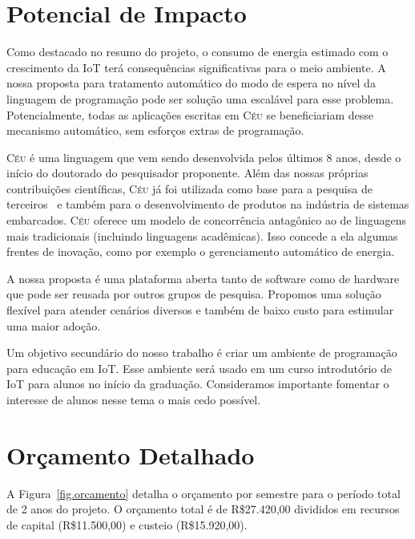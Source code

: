 \documentclass[titlepage,12pt]{article}
\newcommand{\CEU}{\textsc{C\'{e}u}\xspace}
\begin{document}
\section{ Potencial de Impacto }

Como destacado no resumo do projeto, o consumo de energia estimado com o
crescimento da IoT terá consequências significativas para o meio ambiente.
A nossa proposta para tratamento automático do modo de espera no nível da
linguagem de programação pode ser solução uma escalável para esse problema.
Potencialmente, todas as aplicações escritas em \CEU se beneficiariam desse
mecanismo automático, sem esforços extras de programação.

\CEU é uma linguagem que vem sendo desenvolvida pelos últimos 8 anos, desde o
início do doutorado do pesquisador proponente.
Além das nossas próprias contribuições científicas, \CEU já foi utilizada como
base para a pesquisa de terceiros~\cite{ceu.terber} e também para o
desenvolvimento de produtos na indústria de sistemas embarcados.
\CEU oferece um modelo de concorrência antagônico ao de linguagens mais
tradicionais (incluindo linguagens acadêmicas).
Isso concede a ela algumas frentes de inovação, como por exemplo o
gerenciamento automático de energia.

A nossa proposta é uma plataforma aberta tanto de software como de hardware que
pode ser reusada por outros grupos de pesquisa.
Propomos uma solução flexível para atender cenários diversos e também de baixo
custo para estimular uma maior adoção.

Um objetivo secundário do nosso trabalho é criar um ambiente de programação
para educação em IoT.
Esse ambiente será usado em um curso introdutório de IoT para alunos no início
da graduação.
Consideramos importante fomentar o interesse de alunos nesse tema o mais cedo
possível.


\section{ Orçamento Detalhado }

A Figura~\ref{fig.orcamento} detalha o orçamento por semestre para o período
total de 2 anos do projeto.
O orçamento total é de R\$27.420,00 divididos em recursos de capital
(R\$11.500,00) e custeio (R\$15.920,00).
\end{document}
